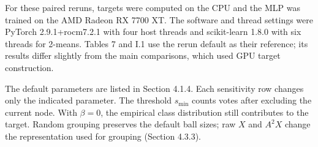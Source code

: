 For these paired reruns, targets were computed on the CPU and the MLP was trained on the AMD Radeon RX 7700 XT. The software and thread settings were PyTorch 2.9.1+rocm7.2.1 with four host threads and scikit-learn 1.8.0 with six threads for 2-means. Tables 7 and I.1 use the rerun default as their reference; its results differ slightly from the main comparisons, which used GPU target construction.

The default parameters are listed in Section 4.1.4. Each sensitivity row changes only the indicated parameter. The threshold \(\mathit{s}_{\min}\) counts votes after excluding the current node. With \(\mathit{\beta = 0}\), the empirical class distribution still contributes to the target. Random grouping preserves the default ball sizes; raw \(\mathit{X}\) and \(\mathit{A}^{2}\mathit{X}\) change the representation used for grouping (Section 4.3.3).

